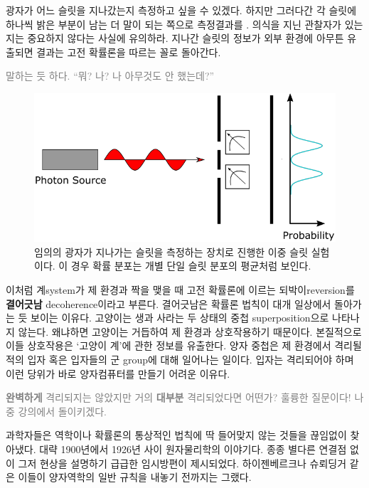 \documentclass[a4paper,chapter,atbegshi,hidelinks]{oblivoir}
\begin{document}
\newpage

광자가 어느 슬릿을 지나갔는지 측정하고 싶을 수 있겠다. 하지만 그러다간 각 슬릿에
하나씩 밝은 부분이 남는 더 말이 되는 쪽으로 측정결과를 . 
의식을 지닌 관찰자가 있는지는 중요하지 않다는 사실에 유의하라. 지나간 슬릿의
정보가 외부 환경에 아무튼 유출되면 결과는 고전 확률론을 따르는 꼴로 돌아간다. 

\hfill

\hfill\parbox[t]{9cm}{\textcolor{gray}{ 말하는 듯 하다. ``뭐? 나? 나 아무것도 안 했는데?''}}

\hfill

\begin{figure}[h]
  \centering
  \includegraphics[width=.8\textwidth]{iqis1_007}
  \caption{\label{fig:figure24}임의의 광자가 지나가는 슬릿을 측정하는 장치로
    진행한 이중 슬릿 실험이다. 이 경우 확률 분포는 개별 단일 슬릿 분포의 평균처럼
  보인다.}
\end{figure}

이처럼 계{\footnotesize system}가 제 환경과 짝을 맺을 때 고전 확률론에 이르는
되박이{\footnotesize reversion}를 \textbf{결어긋남}{\footnotesize
decoherence}이라고 부른다. 결어긋남은 확률론 법칙이 대개 일상에서 돌아가는 듯
보이는 이유다. 고양이는 생과 사라는 두 상태의 중첩{\footnotesize
superposition}으로 나타나지 않는다. 왜냐하면 고양이는 거듭하여 제 환경과
상호작용하기 때문이다. 본질적으로 이들 상호작용은 `고양이 계'에 관한 정보를
유출한다. 양자 중첩은 제 환경에서 격리될 적의 입자 혹은 입자들의 군{\footnotesize
group}에 대해 일어나는 일이다. 입자는 격리되어야 하며 이런 당위가 바로
양자컴퓨터를 만들기 어려운 이유다.

\hfill

\hfill\parbox[t]{9cm}{\textcolor{gray}{ \textbf{완벽하게}
격리되지는 않았지만 거의 \textbf{대부분} 격리되었다면 어떤가? 훌륭한 질문이다!
나중 강의에서 돌이키겠다.}}

\hfill\break

과학자들은 역학이나 확률론의 통상적인 법칙에 딱 들어맞지 않는 것들을 끊임없이
찾아냈다. 대략 1900년에서 1926년 사이 원자물리학의 이야기다. 종종 별다른 연결점
없이 그저 현상을 설명하기 급급한 임시방편이 제시되었다. 하이젠베르크나 슈뢰딩거
같은 이들이 양자역학의 일반 규칙을 내놓기 전까지는 그랬다. 
\end{document}
